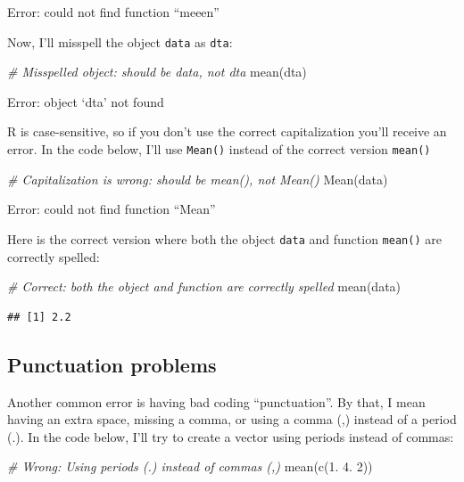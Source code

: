 \documentclass[
]{book}
\newenvironment{Shaded}{\begin{snugshade}}{\end{snugshade}}
\newcommand{\CommentTok}[1]{\textcolor[rgb]{0.56,0.35,0.01}{\textit{#1}}}
\newcommand{\DecValTok}[1]{\textcolor[rgb]{0.00,0.00,0.81}{#1}}
\newcommand{\FloatTok}[1]{\textcolor[rgb]{0.00,0.00,0.81}{#1}}
\newcommand{\FunctionTok}[1]{\textcolor[rgb]{0.00,0.00,0.00}{#1}}
\newcommand{\NormalTok}[1]{#1}
\begin{document}
Error: could not find function ``meeen''

Now, I'll misspell the object \texttt{data} as \texttt{dta}:

\begin{Shaded}
\begin{Highlighting}[]
\CommentTok{\# Misspelled object: should be data, not dta}
\FunctionTok{mean}\NormalTok{(dta)}
\end{Highlighting}
\end{Shaded}

Error: object `dta' not found

R is case-sensitive, so if you don't use the correct capitalization you'll receive an error. In the code below, I'll use \texttt{Mean()} instead of the correct version \texttt{mean()}

\begin{Shaded}
\begin{Highlighting}[]
\CommentTok{\# Capitalization is wrong: should be mean(), not Mean()}
\FunctionTok{Mean}\NormalTok{(data)}
\end{Highlighting}
\end{Shaded}

Error: could not find function ``Mean''

Here is the correct version where both the object \texttt{data} and function \texttt{mean()} are correctly spelled:

\begin{Shaded}
\begin{Highlighting}[]
\CommentTok{\# Correct: both the object and function are correctly spelled}
\FunctionTok{mean}\NormalTok{(data)}
\end{Highlighting}
\end{Shaded}

\begin{verbatim}
## [1] 2.2
\end{verbatim}

\hypertarget{punctuation-problems}{%
\subsection{Punctuation problems}\label{punctuation-problems}}

Another common error is having bad coding ``punctuation''. By that, I mean having an extra space, missing a comma, or using a comma (,) instead of a period (.). In the code below, I'll try to create a vector using periods instead of commas:

\begin{Shaded}
\begin{Highlighting}[]
\CommentTok{\# Wrong: Using periods (.) instead of commas (,)}
\FunctionTok{mean}\NormalTok{(}\FunctionTok{c}\NormalTok{(}\FloatTok{1.} \FloatTok{4.} \DecValTok{2}\NormalTok{))}
\end{Highlighting}
\end{Shaded}
\end{document}
